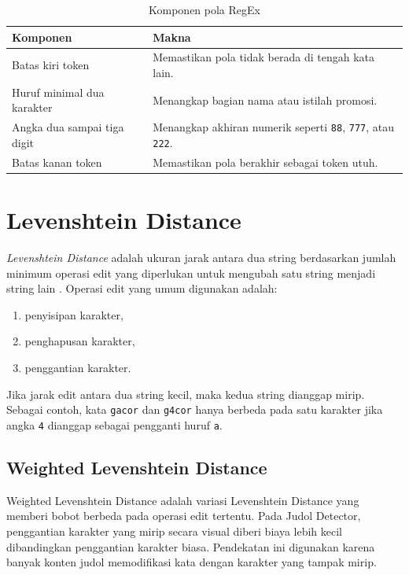 \begin{table}[H]
\centering
\caption{Komponen pola RegEx}
\label{tab:regex-pattern}
\begin{tabular}{|p{4cm}|p{9cm}|}
\hline
\textbf{Komponen} & \textbf{Makna} \\
\hline
Batas kiri token & Memastikan pola tidak berada di tengah kata lain. \\
\hline
Huruf minimal dua karakter & Menangkap bagian nama atau istilah promosi. \\
\hline
Angka dua sampai tiga digit & Menangkap akhiran numerik seperti \texttt{88}, \texttt{777}, atau \texttt{222}. \\
\hline
Batas kanan token & Memastikan pola berakhir sebagai token utuh. \\
\hline
\end{tabular}
\end{table}

\section{Levenshtein Distance}

\textit{Levenshtein Distance} adalah ukuran jarak antara dua string berdasarkan
jumlah minimum operasi edit yang diperlukan untuk mengubah satu string menjadi
string lain \cite{levenshtein1966}. Operasi edit yang umum digunakan adalah:

\begin{enumerate}
    \item penyisipan karakter,
    \item penghapusan karakter,
    \item penggantian karakter.
\end{enumerate}

Jika jarak edit antara dua string kecil, maka kedua string dianggap mirip.
Sebagai contoh, kata \texttt{gacor} dan \texttt{g4cor} hanya berbeda pada satu
karakter jika angka \texttt{4} dianggap sebagai pengganti huruf \texttt{a}.

\subsection{Weighted Levenshtein Distance}

Weighted Levenshtein Distance adalah variasi Levenshtein Distance yang memberi
bobot berbeda pada operasi edit tertentu. Pada Judol Detector, penggantian
karakter yang mirip secara visual diberi biaya lebih kecil dibandingkan
penggantian karakter biasa. Pendekatan ini digunakan karena banyak konten judol
memodifikasi kata dengan karakter yang tampak mirip.

